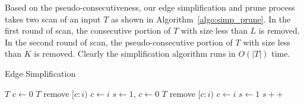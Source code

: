 Based on the pseudo-consecutiveness, our edge simplification and prune process takes
two scan of an input $T$ as shown in Algorithm~\ref{algo:simp_prune}. In the 
first round of scan, the consecutive portion of $T$ with size less than $L$ is removed.
In the second round of scan, the pseudo-consecutive portion of $T$ with size less than $K$
is removed. Clearly the simplification algorithm runs in $O(|T|)$ time.

\begin{algorithm}
\caption{Edge Simplification}
\label{algo:simp_prune}
\begin{algorithmic}
\Require $T$
\State $c \gets 0$
			\State $T$ remove $[c:i)$
		\EndIf
		\State $c \gets i$
	\EndIf
\EndFor
{}
\State $s\gets 1$, $c\gets 0$
			\State $T$ remove $[c:i)$
		\EndIf
		\State $c \gets i$
		\State $s \gets 1$
	\Else
		\State $s++$
	\EndIf
\EndFor
\end{algorithmic}
\end{algorithm}


